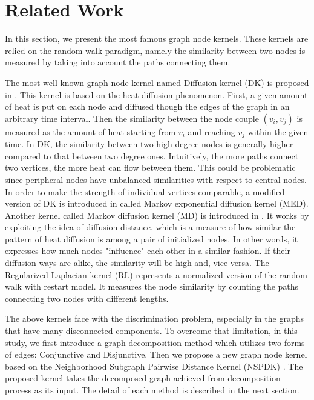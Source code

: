 \documentclass{esannV2}
\begin{document}
\section{Related Work} \label{related_work}
In this section, we present the most famous graph node kernels. These kernels are relied on the random walk paradigm, namely the similarity between two nodes is measured by taking into account the paths connecting them.

The most well-known graph node kernel named Diffusion kernel (DK) is proposed in \cite{ledk}. This kernel is based on the heat diffusion phenomenon. First, a given amount of heat is put on each node and diffused though the edges of the graph in an arbitrary time interval. Then the similarity between the node couple $(v_{i}, v_{j})$ is measured as the amount of heat starting from $v_{i}$ and reaching $v_{j}$ within the given time. In DK, the similarity between two high degree nodes is generally higher compared to that between two degree ones. Intuitively, the more paths connect two vertices, the more heat can flow between them. This could be problematic since peripheral nodes have unbalanced similarities with respect to central nodes. In order to make the strength of individual vertices comparable, a modified version of DK is introduced in \cite{medk} called Markov exponential diffusion kernel (MED). Another kernel called Markov diffusion kernel (MD) is introduced in \cite{mdk}. It works by exploiting the idea of diffusion distance, which is a measure of how similar the pattern of heat diffusion is among a pair of initialized nodes. In other words, it expresses how much nodes "influence" each other in a similar fashion. If their diffusion ways are alike, the similarity will be high and, vice versa. The Regularized Laplacian kernel (RL) \cite{rlk} represents a normalized version of the random walk with restart model. It measures the node similarity by counting the paths connecting two nodes with different lengths.

The above kernels face with the discrimination problem, especially in the graphs that have many disconnected components. To overcome that limitation, in this study, we first introduce a graph decomposition method which utilizes two forms of edges: Conjunctive and Disjunctive. Then we propose a new graph node kernel based on the Neighborhood Subgraph Pairwise Distance Kernel (NSPDK) \cite{nspdk}. The proposed kernel takes the decomposed graph achieved from decomposition process as its input. The detail of each method is described in the next section.
\end{document}
